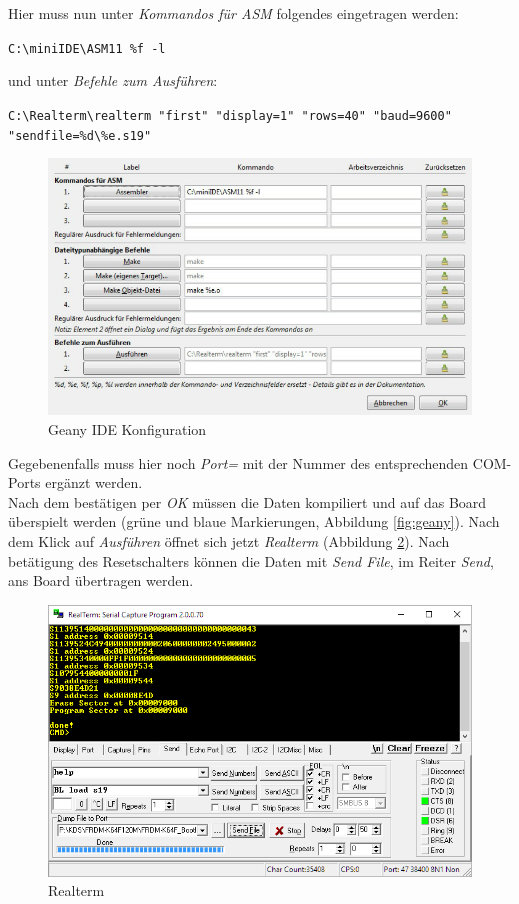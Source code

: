     Hier muss nun unter \textit{Kommandos für ASM} folgendes eingetragen werden:
    \begin{center}
        \texttt{C:\textbackslash{}miniIDE\textbackslash{}ASM11 \%f -l}
    \end{center}
    und unter \textit{Befehle zum Ausführen}:
    \begin{center}
        \texttt{C:\textbackslash{}Realterm\textbackslash{}realterm "{}first"{} "{}display=1"{} "{}rows=40"{} "{}baud=9600"{} "{}sendfile=\%d\textbackslash{}\%e.s19"{}}
    \end{center}
    \begin{figure}[H]
        \centering
        \label{geany-config}
        \includegraphics[scale=0.5]{img/geany-config.png}    
        \caption{Geany IDE Konfiguration}
    \end{figure}
    Gegebenenfalls muss hier noch \textit{Port=} mit der Nummer des entsprechenden COM-Ports ergänzt werden.
    \\
    Nach dem bestätigen per \textit{OK} müssen die Daten kompiliert und auf das Board überspielt werden (grüne und blaue Markierungen, Abbildung \ref{fig:geany}).
    Nach dem Klick auf \textit{Ausführen} öffnet sich jetzt \textit{Realterm} (Abbildung \ref{fig:realterm}). Nach betätigung des Resetschalters können die Daten mit 
    \textit{Send File}, im Reiter \textit{Send}, ans Board übertragen werden. 
    \begin{figure}[H]
        \centering
        \includegraphics[scale=0.5]{img/realterm.png}    
        \caption{Realterm}
        \label{fig:realterm}
    \end{figure}

